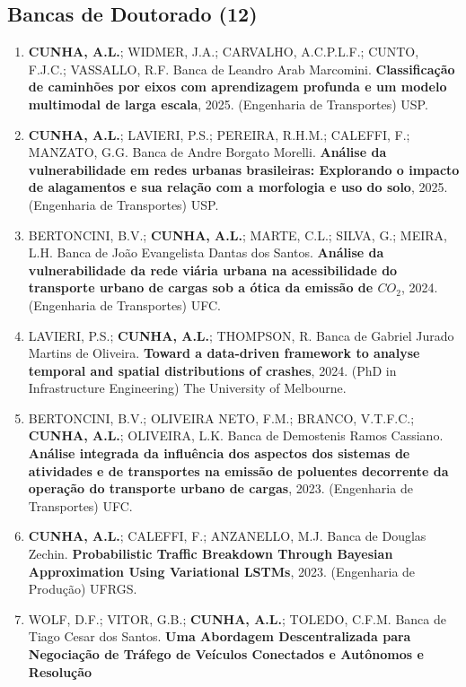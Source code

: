 \documentclass[
  brazilian,
  11pt,
  a4paper,
]{article}
\begin{document}
\subsection{Bancas de Doutorado (12)}\label{bancas-de-doutorado-12}

\begin{enumerate}
\def\labelenumi{\arabic{enumi}.}
\item
  \textbf{CUNHA, A.L.}; WIDMER, J.A.; CARVALHO, A.C.P.L.F.; CUNTO,
  F.J.C.; VASSALLO, R.F. Banca de Leandro Arab Marcomini.
  \textbf{Classificação de caminhões por eixos com aprendizagem profunda
  e um modelo multimodal de larga escala}, 2025. (Engenharia de
  Transportes) USP.
\item
  \textbf{CUNHA, A.L.}; LAVIERI, P.S.; PEREIRA, R.H.M.; CALEFFI, F.;
  MANZATO, G.G. Banca de Andre Borgato Morelli. \textbf{Análise da
  vulnerabilidade em redes urbanas brasileiras: Explorando o impacto de
  alagamentos e sua relação com a morfologia e uso do solo}, 2025.
  (Engenharia de Transportes) USP.
\item
  BERTONCINI, B.V.; \textbf{CUNHA, A.L.}; MARTE, C.L.; SILVA, G.; MEIRA,
  L.H. Banca de João Evangelista Dantas dos Santos. \textbf{Análise da
  vulnerabilidade da rede viária urbana na acessibilidade do transporte
  urbano de cargas sob a ótica da emissão de \(CO_2\)}, 2024.
  (Engenharia de Transportes) UFC.
\item
  LAVIERI, P.S.; \textbf{CUNHA, A.L.}; THOMPSON, R. Banca de Gabriel
  Jurado Martins de Oliveira. \textbf{Toward a data-driven framework to
  analyse temporal and spatial distributions of crashes}, 2024. (PhD in
  Infrastructure Engineering) The University of Melbourne.
\item
  BERTONCINI, B.V.; OLIVEIRA NETO, F.M.; BRANCO, V.T.F.C.;
  \textbf{CUNHA, A.L.}; OLIVEIRA, L.K. Banca de Demostenis Ramos
  Cassiano. \textbf{Análise integrada da influência dos aspectos dos
  sistemas de atividades e de transportes na emissão de poluentes
  decorrente da operação do transporte urbano de cargas}, 2023.
  (Engenharia de Transportes) UFC.
\item
  \textbf{CUNHA, A.L.}; CALEFFI, F.; ANZANELLO, M.J. Banca de Douglas
  Zechin. \textbf{Probabilistic Traffic Breakdown Through Bayesian
  Approximation Using Variational LSTMs}, 2023. (Engenharia de Produção)
  UFRGS.
\item
  WOLF, D.F.; VITOR, G.B.; \textbf{CUNHA, A.L.}; TOLEDO, C.F.M. Banca de
  Tiago Cesar dos Santos. \textbf{Uma Abordagem Descentralizada para
  Negociação de Tráfego de Veículos Conectados e Autônomos e Resolução
}
\end{enumerate}
\end{document}
